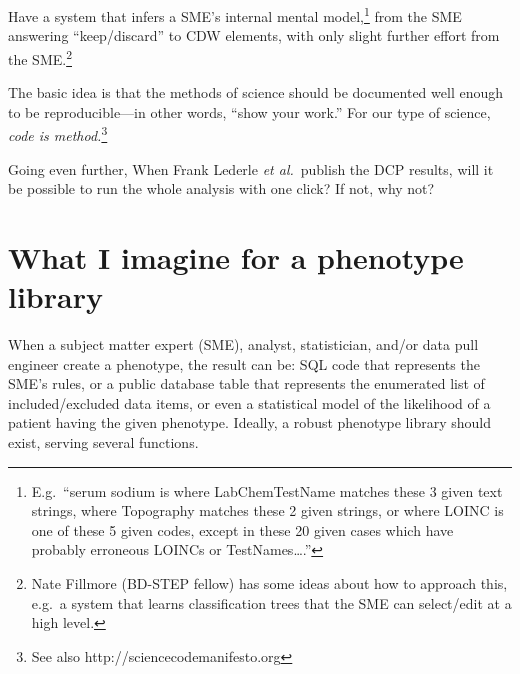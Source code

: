 \documentclass{tufte-handout}
\begin{document}
Have a system that infers a SME's internal mental
model,\footnote{E.g.\ ``serum sodium is where LabChemTestName matches
  these 3 given text strings, where Topography matches these 2 given
  strings, or where LOINC is one of these 5 given codes, except in
  these 20 given cases which have probably erroneous LOINCs or
  TestNames\ldots{}.''} from the SME answering ``keep/discard'' to CDW
elements, with only slight further effort from the SME.\footnote{Nate
  Fillmore (BD-STEP fellow) has some ideas about how to approach this,
  e.g.\ a system that learns classification trees that the SME can
  select/edit at a high level.}

The basic idea is that the methods of science should be documented
well enough to be reproducible---in other words, ``show your work.''
For our type of science, \emph{code is method.}\footnote{See also
http://sciencecodemanifesto.org}


Going even further, When Frank Lederle \emph{et al.}\ publish the DCP
results, will it be possible to run the whole analysis with one click?
If not, why not?


\section{What I imagine for a phenotype library}

When a subject matter expert (SME), analyst, statistician, and/or data
pull engineer create a phenotype, the result can be: SQL code that
represents the SME's rules, or a public database table that represents
the enumerated list of included/excluded data items, or even a
statistical model of the likelihood of a patient having the given
phenotype. Ideally, a robust phenotype library should exist, serving
several functions.
\end{document}
